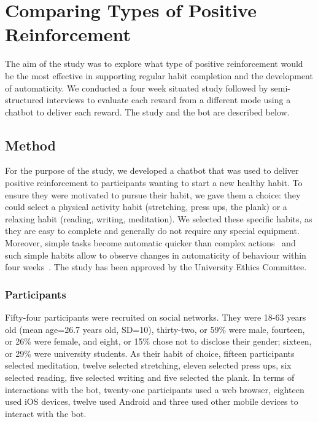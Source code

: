 \documentclass{scaffold/sigchi}
\begin{document}
\section{Comparing Types of Positive Reinforcement}
The aim of the study was to explore what type of positive reinforcement would be the most effective in supporting regular habit completion and the development of automaticity. We conducted a four week situated study followed by semi-structured interviews to evaluate each reward from a different mode using a chatbot to deliver each reward. The study and the bot are described below.

\subsection{Method}
For the purpose of the study, we developed a chatbot that was used to deliver positive reinforcement to participants wanting to start a new healthy habit. To ensure they were motivated to pursue their habit, we gave them a choice: they could select a physical activity habit (stretching, press ups, the plank) or a relaxing habit (reading, writing, meditation). We selected these specific habits, as they are easy to complete and generally do not require any special equipment. Moreover, simple tasks become automatic quicker than complex actions~\cite{article_how_habits_formed_modelling_habit_formation} and such simple habits allow to observe changes in automaticity of behaviour within four weeks~\cite{article_beyond_self_tracking_designing_apps}. 
The study has been approved by the University Ethics Committee.

\subsubsection{Participants}
Fifty-four participants were recruited on social networks. They were 18-63 years old (mean age=26.7 years old, SD=10), thirty-two, or 59\% were male, fourteen, or 26\% were female, and eight, or 15\%  chose not to disclose their gender; sixteen, or 29\% were university students. As their habit of choice, fifteen participants selected meditation, twelve selected stretching, eleven selected press ups, six selected reading, five selected writing and five selected the plank. In terms of interactions with the bot, twenty-one participants used a web browser, eighteen used iOS devices, twelve used Android and three used other mobile devices to interact with the bot. 
\end{document}
